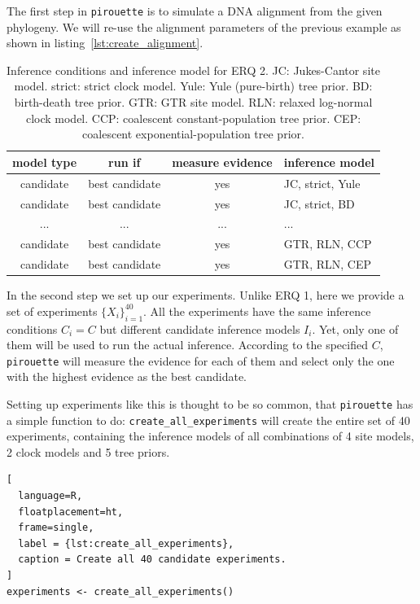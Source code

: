 \documentclass{article}
\begin{document}
The first step in \verb;pirouette; is to simulate a DNA alignment from the 
given phylogeny. 
We will re-use the alignment parameters of the previous example 
as shown in listing~\ref{lst:create_alignment}.

\begin{table}
  \begin{tabular}{ | c | c | c | l | }
    \hline
    \textbf{model type} & \textbf{run if} & \textbf{measure evidence} & 
\textbf{inference model} \\ 
    \hline
    candidate & best candidate & yes & JC, strict, Yule \\
    candidate & best candidate & yes & JC, strict, BD   \\
    ...       & ...            & ... & ...              \\
    candidate & best candidate & yes & GTR, RLN, CCP    \\
    candidate & best candidate & yes & GTR, RLN, CEP    \\
    \hline
  \end{tabular}
  \caption{
    Inference conditions and inference model for ERQ 2.
    JC: Jukes-Cantor site model.
    strict: strict clock model.
    Yule: Yule (pure-birth) tree prior.
    BD: birth-death tree prior.
    GTR: GTR site model.
    RLN: relaxed log-normal clock model.
    CCP: coalescent constant-population tree prior.
    CEP: coalescent exponential-population tree prior.
  }
  \label{tab:RQ2}
\end{table}

In the second step we set up our experiments. Unlike ERQ 1, here we provide a 
set of experiments $\{\mathit{X_{i}}\}_{i=1}^{40}$. All the experiments have 
the same inference conditions $\mathit{C_{i}} = \mathit{C}$ but different 
candidate inference models $\mathit{I_{i}}$. Yet, only one of them will be used 
to run the actual inference. According to the specified $\mathit{C}$, 
\verb;pirouette; will measure the evidence for each of them and select  only 
the one with the highest evidence as the best candidate.

Setting up experiments like this is thought to be so common,
that \verb;pirouette; has a simple function to do:
\verb;create_all_experiments; will create the entire set of 40 experiments,
containing the inference models of all combinations of 4 site 
models, 2 clock models and 5 tree priors.


\begin{lstlisting}[
  language=R, 
  floatplacement=ht, 
  frame=single, 
  label = {lst:create_all_experiments},
  caption = Create all 40 candidate experiments.
]
experiments <- create_all_experiments()
\end{lstlisting}
\end{document}
